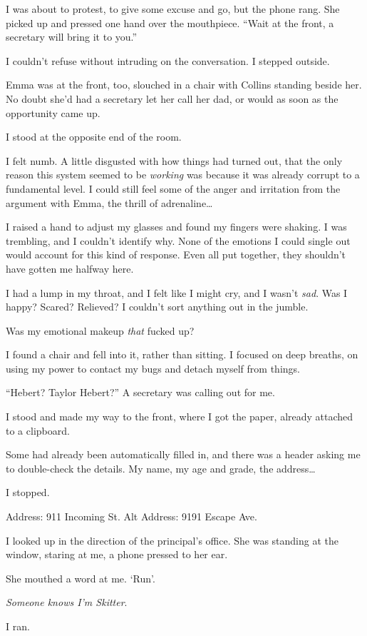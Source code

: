 I was about to protest, to give some excuse and go, but the phone rang.  She picked up and pressed one hand over the mouthpiece.  ``Wait at the front, a secretary will bring it to you.''



I couldn't refuse without intruding on the conversation.  I stepped outside.



Emma was at the front, too, slouched in a chair with Collins standing beside her.  No doubt she'd had a secretary let her call her dad, or would as soon as the opportunity came up.



I stood at the opposite end of the room.



I felt numb.  A little disgusted with how things had turned out, that the only reason this system seemed to be \emph{working} was because it was already corrupt to a fundamental level.  I could still feel some of the anger and irritation from the argument with Emma, the thrill of adrenaline\ldots



I raised a hand to adjust my glasses and found my fingers were shaking.  I was trembling, and I couldn't identify why.  None of the emotions I could single out would account for this kind of response.  Even all put together, they shouldn't have gotten me halfway here.



I had a lump in my throat, and I felt like I might cry, and I wasn't \emph{sad}.  Was I happy?  Scared?  Relieved?  I couldn't sort anything out in the jumble.



Was my emotional makeup \emph{that} fucked up?



I found a chair and fell into it, rather than sitting.  I focused on deep breaths, on using my power to contact my bugs and detach myself from things.



``Hebert?  Taylor Hebert?''  A secretary was calling out for me.



I stood and made my way to the front, where I got the paper, already attached to a clipboard.



Some had already been automatically filled in, and there was a header asking me to double-check the details.  My name, my age and grade, the address\ldots



I stopped.



Address:  911 Incoming St.
Alt Address: 9191 Escape Ave.



I looked up in the direction of the principal's office.  She was standing at the window, staring at me, a phone pressed to her ear.



She mouthed a word at me.  `Run'.



\emph{Someone knows I'm Skitter}.



I ran.





